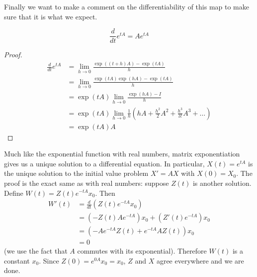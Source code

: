 Finally we want to make a comment on the differentiability of this map to make sure that it is what we expect.
\begin{lemma}
$$ \frac{d}{dt} e^{tA} = A e^{tA} $$
\end{lemma}
\begin{proof}
\begin{align*}
    \frac{d}{dt} e^{tA} &= \lim_{h \to 0} \frac{\exp((t + h)A) - \exp(tA)}{h}\\
    &= \lim_{h \to 0} \frac{\exp(tA)\exp(hA) - \exp(tA)}{h}\\
    &= \exp(tA) \lim_{h \to 0} \frac{\exp(hA) - I}{h}\\
    &= \exp(tA) \lim_{h \to 0} \frac{1}{h} \left( hA + \frac{h^2}{2} A^2 + \frac{h^3}{3!} A^3 + \dots \right)\\
    &= \exp(tA) A
\end{align*}
\end{proof}
Much like the exponential function with real numbers, matrix exponentiation gives us a unique solution to a differential equation. In particular, $X(t) = e^{tA}$ is the unique solution to the initial value problem $X' = AX$ with $X(0) = X_0$. The proof is the exact same as with real numbers: suppose $Z(t)$ is another solution. Define $W(t) = Z(t) e^{-tA} x_0$. Then
\begin{align*}
    W'(t) &= \frac{d}{dt} (Z(t) e^{-tA} x_0)\\
    &= (-Z(t)A e^{-tA}) x_0 + (Z'(t) e^{-tA}) x_0\\
    &= (-A e^{-tA} Z(t) + e^{-tA} AZ(t))x_0\\
    &= 0
\end{align*}
(we use the fact that $A$ commutes with its exponential). Therefore $W(t)$ is a constant $x_0$. Since $Z(0) = e^{0A} x_0 = x_0$, $Z$ and $X$ agree everywhere and we are done.